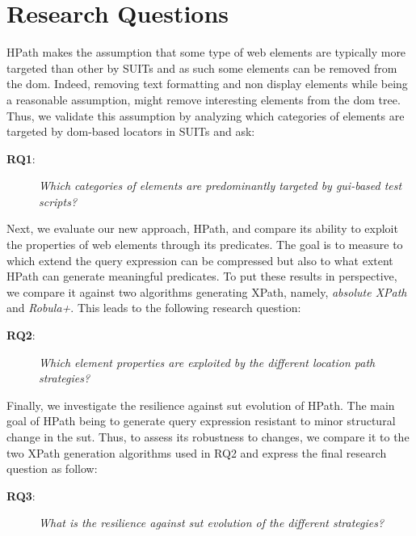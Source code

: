 \section{Research Questions}
\label{sec:hpath-rqs}

HPath makes the assumption that some type of web elements are typically more targeted than other by SUITs and as such some elements can be removed from the \gls{dom}. Indeed, removing text formatting and non display elements while being a reasonable assumption, might remove interesting elements from the \gls{dom} tree. Thus, we validate this assumption by analyzing which categories of elements are targeted by \gls{dom}-based locators in SUITs and ask:

\begin{description} 
\item[\textbf{RQ1}:]
\emph{Which categories of elements are predominantly targeted by \gls{gui}-based test scripts?} 
\end{description} 

Next, we evaluate our new approach, HPath, and compare its ability to exploit the properties of web elements through its predicates. The goal is to measure to which extend the query expression can be compressed but also to what extent HPath can generate meaningful predicates. To put these results in perspective, we compare it against two algorithms generating XPath, namely, \emph{absolute XPath} and \emph{Robula+}. This leads to the following research question:

\begin{description} 
\item[\textbf{RQ2}:]
\emph{Which element properties are exploited by the different location path strategies?} 
\end{description} 
        
Finally, we investigate the resilience against \gls{sut} evolution of HPath. The main goal of HPath being to generate query expression resistant to minor structural change in the \gls{sut}. Thus, to assess its robustness to changes, we compare it to the two XPath generation algorithms used in RQ2 and express the final research question as follow:

\begin{description} 
\item[\textbf{RQ3}:]
\emph{What is the resilience against \gls{sut} evolution of the different strategies?} 
\end{description} 